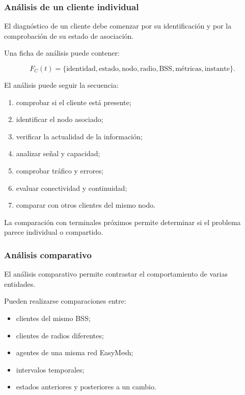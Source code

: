 \subsubsection*{Análisis de un cliente individual}

El diagnóstico de un cliente debe comenzar por su identificación y por
la comprobación de su estado de asociación.

Una ficha de análisis puede contener:

\[
    F_C(t)
    =
    \{
        \text{identidad},
        \text{estado},
        \text{nodo},
        \text{radio},
        \text{BSS},
        \text{métricas},
        \text{instante}
    \}.
\]

El análisis puede seguir la secuencia:

\begin{enumerate}
    \item comprobar si el cliente está presente;

    \item identificar el nodo asociado;

    \item verificar la actualidad de la información;

    \item analizar señal y capacidad;

    \item comprobar tráfico y errores;

    \item evaluar conectividad y continuidad;

    \item comparar con otros clientes del mismo nodo.
\end{enumerate}

La comparación con terminales próximos permite determinar si el problema
parece individual o compartido.


\subsubsection*{Análisis comparativo}

El análisis comparativo permite contrastar el comportamiento de varias
entidades.

Pueden realizarse comparaciones entre:

\begin{itemize}
    \item clientes del mismo BSS;

    \item clientes de radios diferentes;

    \item agentes de una misma red EasyMesh;

    \item intervalos temporales;

    \item estados anteriores y posteriores a un cambio.
\end{itemize}

